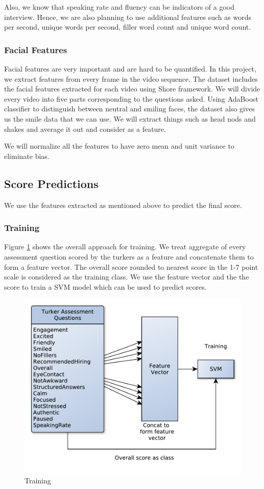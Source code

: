 \documentclass[11pt]{article}
\begin{document}
Also, we know that speaking rate and fluency can be indicators of a good interview. Hence, we are also planning to use additional features such as words per second, unique words per second, filler word count and unique word count. 
\subsubsection{Facial Features}
Facial features are very important and are hard to be quantified. In this project, we extract features from every frame in the video sequence. The dataset includes the facial features extracted for each video using Shore framework. We will divide every video into five parts corresponding to the questions asked. Using AdaBoost classifier to distinguish between neutral and smiling faces, the dataset also gives us the smile data that we can use. We will extract things such as head nods and shakes and average it out and consider as a feature. 

We will normalize all the features to have zero mean and unit variance to eliminate bias.

\subsection{Score Predictions}
We use the features extracted as mentioned above to predict the final score.
\subsubsection{Training}
Figure \ref{fig:methodology-training} shows the overall approach for training. We treat aggregate of every assessment question scored by the turkers as a feature and concatenate them to form a feature vector. The overall score rounded to nearest score in the 1-7 point scale is considered as the training class. We use the feature vector and the the score to train a SVM model which can be used to predict scores.
\begin{figure}[h!]
\begin{center}
\includegraphics[width=0.7\columnwidth]{figures/methodology-training.pdf}
\caption{Training}
\label{fig:methodology-training}
\end{center}
\end{figure}
\end{document}
